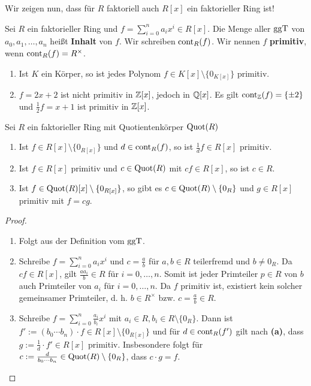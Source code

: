 \begin{leftbar}
	Wir zeigen nun, dass für $R$ faktoriell auch $R[x]$ ein faktorieller Ring ist!
\end{leftbar}
\begin{definition}\label{definition6_18}
	Sei $R$ ein faktorieller Ring und $f = \sum_{i=0}^n a_i x^i \in R[x]$. Die Menge aller $\mathrm{ggT}$ von $a_0, a_1, \dots, a_n$ heißt \textbf{Inhalt} von $f$. Wir schreiben $\mathrm{cont}_R(f)$. Wir nennen $f$ \textbf{primitiv}, wenn $\mathrm{cont}_R(f) = R^\times$.
\end{definition}
\begin{beispiel}\label{beispiel6_19}
	\begin{enumerate}[label=(\arabic*)]
		\item Ist $K$ ein Körper, so ist jedes Polynom $f \in K[x]\setminus\{0_{K[x]}\}$ primitiv.
		\item $f = 2x + 2$ ist nicht primitiv in $\mathbb{Z}[x]$, jedoch in $\mathbb{Q}[x]$. Es gilt $\mathrm{cont}_{\mathbb{Z}} (f) = \{\pm 2\}$ und $\frac{1}{2}f = x + 1$ ist primitiv in $\mathbb{Z}[x]$.
	\end{enumerate}
\end{beispiel}
\begin{lem}\label{lem6_20}
	Sei $R$ ein faktorieller Ring mit Quotientenkörper $\mathrm{Quot}(R)$
	\begin{enumerate}[label=(\alph*)]
		\item Ist $f \in R[x]\setminus\{0_{R[x]}\}$ und $d \in \mathrm{cont}_R(f)$, so ist $\frac{1}{d} f \in R[x]$ primitiv.
		\item Ist $f \in R[x]$ primitiv und $c \in \mathrm{Quot}(R)$ mit $cf \in R[x]$, so ist $c \in R$.
		\item Ist $f \in \mathrm{Quot}(R)[x]\setminus \{0_{R[x]}\}$, so gibt es $c \in \mathrm{Quot}(R) \setminus \{0_{R}\}$ und $g \in R[x]$ primitiv mit $f = cg$.
	\end{enumerate}
\end{lem}
\begin{proof}
	\begin{enumerate}[label=(\alph*)]
		\item Folgt aus der Definition vom $\mathrm{ggT}$.
		\item Schreibe $f = \sum_{i=0}^n a_i x^i$ und $c = \frac{a}{b}$ für $a,b \in R$ teilerfremd und $b \neq 0_R$. Da $cf \in R[x]$, gilt $\frac{a a_i}{b} \in R$ für $i = 0,\dots, n$. Somit ist jeder Primteiler $p \in R$ von $b$ auch Primteiler von $a_i$ für $i = 0,\dots,n$. Da $f$ primitiv ist, existiert kein solcher gemeinsamer Primteiler, d. h. $b \in R^\times$ bzw. $c =\frac{a}{b} \in R$.
		\item Schreibe $f = \sum_{i=0}^n \frac{a_i}{b_i} x^i$ mit $a_i \in R, b_i \in R\setminus \{0_R\}$. Dann ist $f' := (b_0 \cdots b_n)\cdot f \in R[x] \setminus\{0_{R[x]}\}$ und für $d \in \mathrm{cont}_R(f')$ gilt nach \textbf{(a)}, dass $g := \frac{1}{d} \cdot f' \in R[x]$ primitiv. Insbesondere folgt für $c := \frac{d}{b_0 \cdots b_n} \in \mathrm{Quot}(R)\setminus \{0_R\}$, dass $c \cdot g = f$.
	\end{enumerate}
\end{proof}
